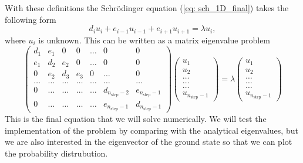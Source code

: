 \documentclass[11pt,a4wide]{article}
\begin{document}
With these definitions the Schr\"odinger equation (\ref{eq: sch_1D_final}) takes the following form
\begin{equation}
d_iu_i+e_{i-1}u_{i-1}+e_{i+1}u_{i+1}  = \lambda u_i,
\label{eq: sch_1d_descrete}
\end{equation}
where $u_i$ is unknown. This can be written as a matrix eigenvalue problem
\begin{equation}
    \left( \begin{array}{ccccccc} d_1 & e_1 & 0   & 0    & \dots  &0     & 0 \\
                                e_1 & d_2 & e_2 & 0    & \dots  &0     &0 \\
                                0   & e_2 & d_3 & e_3  &0       &\dots & 0\\
                                \dots  & \dots & \dots & \dots  &\dots      &\dots & \dots\\
                                0   & \dots & \dots & \dots  &\dots       &d_{n_{\mathrm{step}}-2} & e_{n_{\mathrm{step}}-1}\\
                                0   & \dots & \dots & \dots  &\dots       &e_{n_{\mathrm{step}}-1} & d_{n_{\mathrm{step}}-1}

             \end{array} \right)      \left( \begin{array}{c} u_{1} \\
                                                              u_{2} \\
                                                              \dots\\ \dots\\ \dots\\
                                                              u_{n_{\mathrm{step}}-1}
             \end{array} \right)=\lambda \left( \begin{array}{c} u_{1} \\
                                                              u_{2} \\
                                                              \dots\\ \dots\\ \dots\\
                                                              u_{n_{\mathrm{step}}-1}
             \end{array} \right) 
      \label{eq:sematrix}
\end{equation} 
This is the final equation that we will solve numerically. We will test the implementation of the problem by comparing with the analytical eigenvalues, but we are also interested in the eigenvector of the ground state so that we can plot the probability distrubution.
\end{document}

